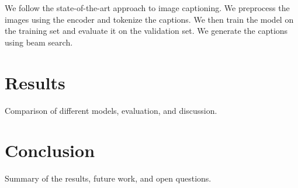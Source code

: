 \documentclass[12pt]{article}
\theoremstyle{plain}
\theoremstyle{definition}
\theoremstyle{remark}
\begin{document}
We follow the state-of-the-art approach to image captioning. We preprocess the images using the encoder and tokenize the captions. We then train the model on the training set and evaluate it on the validation set. We generate the captions using beam search.

\section{Results}
\label{sec:results}

Comparison of different models, evaluation, and discussion.

\section{Conclusion}
\label{sec:concl}

Summary of the results, future work, and open questions.



\newpage
\thispagestyle{empty}

\nocite{*}


\end{document}
